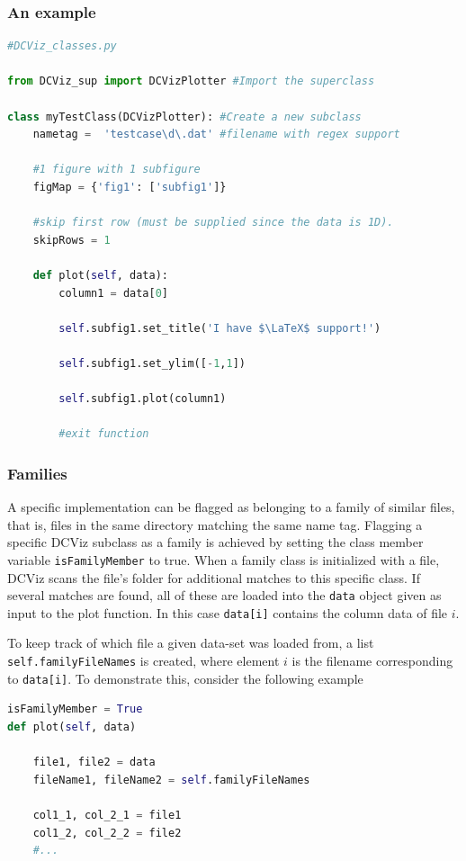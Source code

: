 \subsubsection{An example}

\begin{lstlisting}[language=Python, otherkeywords={self}]
#DCViz_classes.py

from DCViz_sup import DCVizPlotter #Import the superclass

class myTestClass(DCVizPlotter): #Create a new subclass
    nametag =  'testcase\d\.dat' #filename with regex support
    
    #1 figure with 1 subfigure
    figMap = {'fig1': ['subfig1']}
    
    #skip first row (must be supplied since the data is 1D).
    skipRows = 1    
    
    def plot(self, data):
        column1 = data[0]

        self.subfig1.set_title('I have $\LaTeX$ support!')
              
        self.subfig1.set_ylim([-1,1])
          
        self.subfig1.plot(column1)
        
        #exit function
\end{lstlisting}


\subsubsection{Families}

A specific implementation can be flagged as belonging to a family of similar files, that is, files in the same directory matching the same name tag. Flagging a specific DCViz subclass as a family is achieved by setting the class member variable \verb+isFamilyMember+ to true. When a family class is initialized with a file, DCViz scans the file's folder for additional matches to this specific class. If several matches are found, all of these are loaded into the \verb+data+ object given as input to the plot function. In this case \verb+data[i]+ contains the column data of file $i$.

To keep track of which file a given data-set was loaded from, a list \verb+self.familyFileNames+ is created, where element $i$ is the filename corresponding to \verb+data[i]+. To demonstrate this, consider the following example

\begin{lstlisting}[language=Python, otherkeywords={self}]
isFamilyMember = True
def plot(self, data)

    file1, file2 = data
    fileName1, fileName2 = self.familyFileNames
    
    col1_1, col_2_1 = file1
    col1_2, col_2_2 = file2
    #...
\end{lstlisting}

